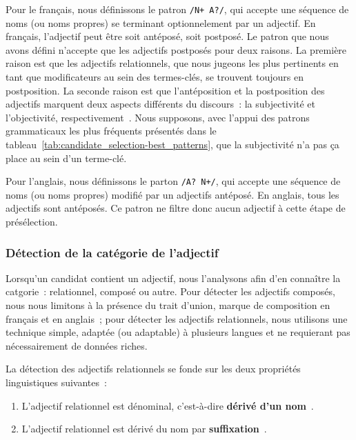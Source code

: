         Pour le français, nous définissons le patron \texttt{/N+ A?/}, qui
        accepte une séquence de noms (ou noms propres) se terminant
        optionnelement par un adjectif. En français, l'adjectif peut être soit
        antéposé, soit postposé. Le patron que nous avons défini n'accepte que
        les adjectifs postposés pour deux raisons. La première raison est que
        les adjectifs relationnels, que nous jugeons les plus pertinents en tant
        que modificateurs au sein des termes-clés, se trouvent toujours en
        postposition. La seconde raison est que l'antéposition et la
        postposition des adjectifs marquent deux aspects différents du
        discours~: la subjectivité et l'objectivité,
        respectivement~\cite{eskenazi2005adjectifavantapres}. Nous supposons,
        avec l'appui des patrons grammaticaux les plus fréquents présentés dans
        le tableau~\ref{tab:candidate_selection-best_patterns}, que la
        subjectivité n'a pas ça place au sein d'un terme-clé.
        
        Pour l'anglais, nous définissons le parton \texttt{/A? N+/}, qui
        accepte une séquence de noms (ou noms propres) modifié par un adjectifs
        antéposé. En anglais, tous les adjectifs sont antéposés. Ce patron ne
        filtre donc aucun adjectif à cette étape de présélection.

      \subsubsection{Détection de la catégorie de l'adjectif}
      \label{subsubsec:main-automatic_keyphrase_annotation-keyphrase_candidate_selection-modifiers_filtering-relational_adjective_detection}
        Lorsqu'un candidat contient un adjectif, nous l'analysons afin d'en
        connaître la catgorie~: relationnel, composé ou autre. Pour détecter les
        adjectifs composés, nous nous limitons à la présence du trait d'union,
        marque de composition en français et en anglais~; pour détecter les
        adjectifs relationnels, nous utilisons une technique simple, adaptée (ou
        adaptable) à plusieurs langues et ne requierant pas nécessairement de
        données riches.

        La détection des adjectifs relationnels se fonde sur les deux propriétés
        linguistiques suivantes~:
        \begin{enumerate}
          \item{L'adjectif relationnel est dénominal, c'est-à-dire
                \textbf{dérivé d'un
                nom}~\cite{bally1944linguistiquegeneraleetlinguistiquefrancaise}.}
          \item{L'adjectif relationnel est dérivé du nom par
                \textbf{suffixation}~\cite{dubois1999derivation}.}
        \end{enumerate}

